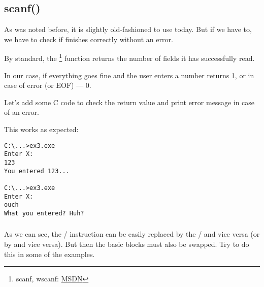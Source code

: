 \subsection{scanf()}

As was noted before, it is slightly old-fashioned to use \scanf today. 
But if we have to, we have to check if \scanf finishes correctly without an error.



By standard, the \scanf\footnote{scanf, wscanf: \href{http://go.yurichev.com/17255}{MSDN}} function returns the number of fields it has successfully read.

In our case, if everything goes fine and the user enters a number \scanf returns 1, or in case of error (or \ac{EOF}) --- 0.

Let's add some C code to check the \scanf return value and print error message in case of an error.

This works as expected:

\begin{lstlisting}
C:\...>ex3.exe
Enter X:
123
You entered 123...

C:\...>ex3.exe
Enter X:
ouch
What you entered? Huh?
\end{lstlisting}






\subsubsection{\Exercise}

As we can see, the / instruction can be easily replaced by the / and vice versa 
(or  by  and vice versa).
But then the basic blocks must also be swapped.
Try to do this in some of the examples.

